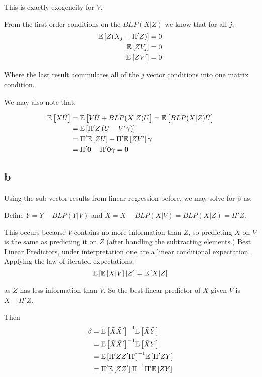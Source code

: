 \documentclass[12pt]{paper}
\begin{document}
This is exactly exogeneity for $V$.

From the first-order conditions on the $BLP( X \vert Z)$ we know that for
all $j$,
\begin{align*}
  \mathbb{E} \left [  Z ( X_j - \Pi' Z) \right ] &= 0\\
  \mathbb{E} \left [  Z V_j  \right ] &= 0\\
  \mathbb{E} \left [  Z V' \right ] &= 0
\end{align*}

Where the last result accumulates all of the $j$ vector conditions
into one matrix condition.

We may also note that:

\begin{align*}
  \mathbb{E} \left [  X \tilde{U} \right ] &= \mathbb{E} \left [  V \tilde{U} + BLP( X \vert Z) \tilde{U} \right ] =
                       \mathbb{E} \left [  BLP( X \vert Z) \tilde{U} \right ]\\
  &=\mathbb{E} \left [   \Pi' Z \left( U - V'\gamma \right) \right ]\\
  &= \Pi' \mathbb{E} \left [  Z U \right ] - \Pi' \mathbb{E} \left [ Z V' \right ]\gamma\\
  &= \Pi ' \bm{ 0 } - \Pi' \bm{ 0 } \gamma = \bm{ 0 }\\
\end{align*}

\subsection*{b}

Using the sub-vector results from linear regression before, we may
solve for $\beta$ as:

Define $\tilde{Y} = Y - BLP( Y \vert V)$ and $\tilde{X} = X - BLP( X \vert V)
= BLP( X \vert Z) = \Pi'Z$.


This occurs because $V$ contains no more information than $Z$, so
predicting $X$ on $V$ is the same as predicting it on $Z$ (after
handling the subtracting elements.) Best Linear Predictors, under
interpretation one are a linear conditional expectation. Applying the
law of iterated expectations:
\begin{equation*}
  \mathbb{E} \left [  \mathbb{E} \left [  X \vert V \right ] \vert Z \right ] = \mathbb{E} \left [  X \vert Z \right ]
\end{equation*}

as $Z$ has less information than $V$. So the best linear predictor of
$X$ given $V$ is $X - \Pi'Z$. 

Then
\begin{align*}
  \beta &= { \mathbb{E} \left [  \tilde{X} \tilde{X}' \right ]}^{-1} \mathbb{E} \left [  \tilde{X} \tilde{Y} \right ]\\
    &= { \mathbb{E} \left [  \tilde{X} \tilde{X}' \right ]}^{-1} \mathbb{E} \left [  \tilde{X} Y \right ]\\
    &= { \mathbb{E} \left [  \Pi'ZZ' \Pi'  \right ]}^{-1} \mathbb{E} \left [  \Pi'ZY \right ]\\
    &= { \Pi' \mathbb{E} \left [ ZZ' \right ] \Pi}^{-1} \Pi' \mathbb{E} \left [ ZY \right ]
\end{align*}
\end{document}
